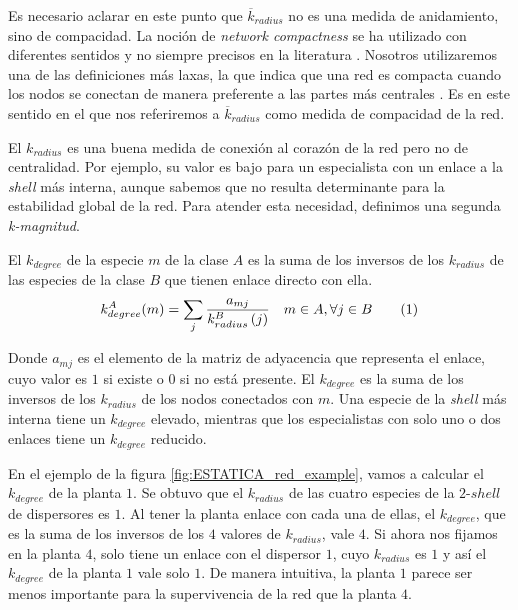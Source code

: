 Es necesario aclarar en este punto que $\overline {k}_{radius}$ no es una medida de anidamiento, sino de compacidad. La noción de \textit{network compactness} se ha utilizado con diferentes sentidos y no siempre precisos en la literatura \cite{wagner2003does, egghe2003measure, chapanond2005graph, zhang2011constructing}. Nosotros utilizaremos una de las definiciones más laxas, la que indica que una red es compacta cuando los nodos se conectan de manera preferente a las partes más centrales \cite{alava2004preferential}. Es en este sentido en el que nos referiremos a $\overline {k}_{radius}$ como medida de compacidad de la red.

El ${k}_{radius}$ es una buena medida de conexión al corazón de la red pero no de centralidad. Por ejemplo, su valor es bajo para un especialista con un enlace a la \textit{shell} más interna, aunque sabemos que no resulta determinante para la estabilidad global de la red. Para atender esta necesidad, definimos una segunda \textit{k-magnitud}.

\begin{theo} 
El \textit{$k_{degree}$} de la especie $m$ de la clase $A$ es la suma de los inversos de los $k_{radius}$ de las especies de la clase $B$ que tienen enlace directo con ella.
\begin{align*}
\displaystyle
k^A_{degree}(m) = \sum\limits_{j} \frac{a_{mj} }{k^B_{radius}\left(j\right)}  \quad   m \in A, \forall j \in B
\stepcounter{equation}\tag{\theequation}
\end{align*}
\label{kdegree}
\end{theo}

Donde $a_{mj}$ es el elemento de la matriz de adyacencia que representa el enlace, cuyo valor es $1$ si existe o $0$ si no está presente. El $k_{degree}$ es la suma de los inversos de los $k_{radius}$ de los nodos conectados con $m$. Una especie de la \textit{shell} más interna tiene un $k_{degree}$ elevado,  mientras que los especialistas con solo uno o dos enlaces tiene un $k_{degree}$ reducido. 

En el ejemplo de la figura \ref{fig:ESTATICA_red_example}, vamos a calcular el $k_{degree}$ de la planta $1$. Se obtuvo que el $k_{radius}$ de las cuatro especies de la $2$-$shell$ de dispersores es $1$. Al tener la planta enlace con cada una de ellas, el $k_{degree}$, que es la suma de los inversos de los $4$ valores de $k_{radius}$, vale $4$. Si ahora nos fijamos en la planta $4$, solo tiene un enlace con el dispersor $1$, cuyo $k_{radius}$ es $1$ y así el $k_{degree}$ de la planta $1$ vale solo $1$. De manera intuitiva, la planta $1$ parece ser menos importante para la supervivencia de la red que la planta $4$. 

